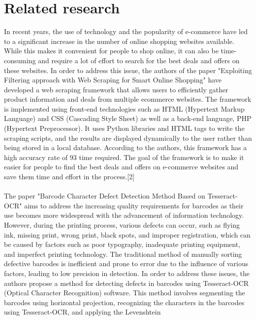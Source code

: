 \section{Related research}

In recent years, the use of technology and the popularity of e-commerce have led to a 
significant increase in the number of online shopping websites available. While this 
makes it convenient for people to shop online, it can also be time-consuming and 
require a lot of effort to search for the best deals and offers on these websites. In order 
to address this issue, the authors of the paper "Exploiting Filtering approach with Web 
Scraping for Smart Online Shopping" have developed a web scraping framework that 
allows users to efficiently gather product information and deals from multiple ecommerce websites. The framework is implemented using front-end technologies such 
as HTML (Hypertext Markup Language) and CSS (Cascading Style Sheet) as well as 
a back-end language, PHP (Hypertext Preprocessor). It uses Python libraries and 
HTML tags to write the scraping scripts, and the results are displayed dynamically to 
the user rather than being stored in a local database. According to the authors, this 
framework has a high accuracy rate of 93%
time required. The goal of the framework is to make it easier for people to find the best 
deals and offers on e-commerce websites and save them time and effort in the process.[2] 
\\
\\
The paper "Barcode Character Defect Detection Method Based on Tesseract-OCR" 
aims to address the increasing quality requirements for barcodes as their use becomes 
more widespread with the advancement of information technology. However, during 
the printing process, various defects can occur, such as flying ink, missing print, wrong 
print, black spots, and improper registration, which can be caused by factors such as 
poor typography, inadequate printing equipment, and imperfect printing technology. 
The traditional method of manually sorting defective barcodes is inefficient and prone 
to error due to the influence of various factors, leading to low precision in detection. In 
order to address these issues, the authors propose a method for detecting defects in 
barcodes using Tesseract-OCR (Optical Character Recognition) software. This method 
involves segmenting the barcodes using horizontal projection, recognizing the 
characters in the barcodes using Tesseract-OCR, and applying the Levenshtein 
